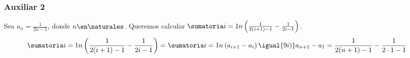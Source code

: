 \begin{enumerate}[label=\roman*)]
	      \subsubsection*{Auxiliar 2}
	      Sea $ a_n = \frac{1}{2n-1}$, donde $n \en \naturales $. Queremos calcular $ \suma1n \left(\frac{1}{2(i+1)-1} - \frac{1}{2i-1}\right)$.
	      \begin{align*}
		      \suma1n \left( \frac{1}{2(i+1)-1} - \frac{1}{2i-1}\right) =
		      \suma1n \left(a_{i+1}- a_i \right) \igual{9i)}
		      a_{n+1} - a_1 =
		      \frac{1}{2(n+1)-1} - \frac{1}{2\cdot 1-1}
	      \end{align*}
\end{enumerate}
